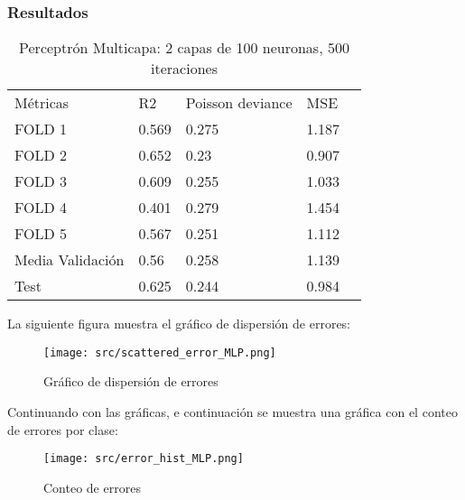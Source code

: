 \subsubsection{Resultados}
\begin{table}[htbp]
	\begin{tabular}{|l|l|l|l|l}
		\cline{1-4}
		Métricas         & R2    & Poisson deviance & MSE   \\ \cline{1-4}
		FOLD 1           & 0.569 & 0.275            & 1.187 \\ \cline{1-4}
		FOLD 2           & 0.652 & 0.23             & 0.907 \\ \cline{1-4}
		FOLD 3           & 0.609 & 0.255            & 1.033 \\ \cline{1-4}
		FOLD 4           & 0.401 & 0.279            & 1.454 \\ \cline{1-4}
		FOLD 5           & 0.567 & 0.251            & 1.112 \\ \cline{1-4}
		Media Validación & 0.56  & 0.258            & 1.139 \\ \cline{1-4}
		Test	         & 0.625 & 0.244            & 0.984 \\ \cline{1-4}
	\end{tabular}
	\caption{Perceptrón Multicapa: 2 capas de 100 neuronas, 500 iteraciones}
	\label{tab:mlp_res}
\end{table}
La siguiente figura muestra el gráfico de dispersión de errores:
\begin{figure}[H]
	\centering
	\texttt{[image: src/scattered\_error\_MLP.png]}
	\caption{Gráfico de dispersión de errores}
	\label{fig:mlp_scattered}
\end{figure}
Continuando con las gráficas, e continuación se muestra una gráfica con el conteo de errores por clase:\\
\linebreak
\begin{figure}[H]
	\centering
	\texttt{[image: src/error\_hist\_MLP.png]}
	\caption{Conteo de errores}
	\label{fig:mlp_error_plot}
\end{figure}
